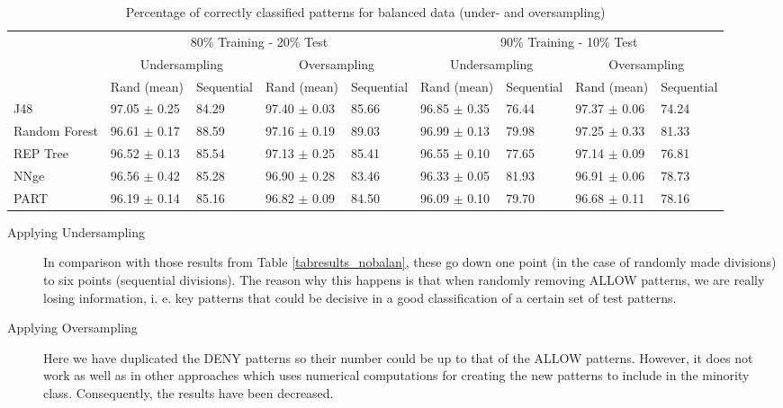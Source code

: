 \documentclass{llncs}
\begin{document}
\begin{table*}[htpb]
\centering
 \caption{\label{tabresults_balan} Percentage of correctly classified
   patterns for balanced data (under- and oversampling)}
{\small
\begin{tabular}{|l|l|l|l|l|l|l|l|l|}
\cline{2-9}
\multicolumn{1}{l|}{} & \multicolumn{4}{c|}{80\% Training - 20\% Test} & \multicolumn{4}{c|}{90\% Training - 10\% Test} \\ 
\cline{2-9}
\multicolumn{1}{l|}{} & \multicolumn{2}{c|}{Undersampling} & \multicolumn{2}{c|}{Oversampling} & \multicolumn{2}{c|}{Undersampling} & \multicolumn{2}{c|}{Oversampling} \\ 
\cline{2-9}
\multicolumn{1}{l|}{} & Rand (mean) & Sequential & Rand (mean) & Sequential & Rand (mean) & Sequential & Rand (mean) & Sequential \\ 
\hline
J48 & 97.05 $\pm$ 0.25 & 84.29 & 97.40 $\pm$ 0.03 & 85.66 & 96.85 $\pm$ 0.35 & 76.44 & 97.37 $\pm$ 0.06 & 74.24 \\ 
\cline{1-1}
Random Forest & 96.61 $\pm$ 0.17 & 88.59 & 97.16 $\pm$ 0.19 & 89.03 & 96.99 $\pm$ 0.13 & 79.98 & 97.25 $\pm$ 0.33 & 81.33 \\ 
\cline{1-1}
REP Tree & 96.52 $\pm$ 0.13 & 85.54 & 97.13 $\pm$ 0.25 & 85.41 & 96.55 $\pm$ 0.10 & 77.65 & 97.14 $\pm$ 0.09 & 76.81 \\ 
\cline{1-1}
NNge & 96.56 $\pm$ 0.42 & 85.28 & 96.90 $\pm$ 0.28 & 83.46 & 96.33 $\pm$ 0.05 & 81.93 & 96.91 $\pm$ 0.06 & 78.73 \\ 
\cline{1-1}
PART & 96.19 $\pm$ 0.14 & 85.16 & 96.82 $\pm$ 0.09 & 84.50 & 96.09 $\pm$ 0.10 & 79.70 & 96.68 $\pm$ 0.11 & 78.16 \\ 
\hline
\end{tabular}
}
\end{table*}

\begin{description}
  \item[Applying Undersampling] In comparison with those results from Table \ref{tabresults_nobalan}, these go down one point (in the case of randomly made divisions) to six points (sequential divisions). The reason why this happens is that when randomly removing ALLOW patterns, we are really losing information, i. e. key patterns that could be decisive in a good classification of a certain set of test patterns. 
  \item[Applying Oversampling] Here we have duplicated the DENY patterns so their number could be up to that of the ALLOW patterns. However, it does not work as well as in other approaches which uses numerical computations for creating the new patterns to include in the minority class. Consequently, the results have been decreased.
\end{description}
\end{document}
